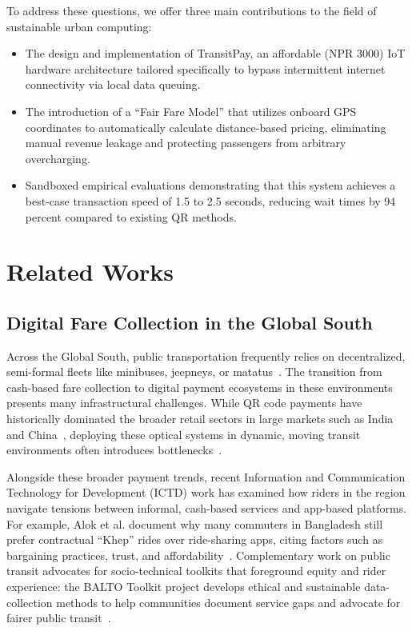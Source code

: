 \documentclass[manuscript,review,anonymous]{acmart}
\begin{document}
To address these questions, we offer three main contributions to the field of sustainable urban computing:
\begin{itemize}
  \item The design and implementation of TransitPay, an affordable (NPR 3000) IoT hardware architecture tailored specifically to bypass intermittent internet connectivity via local data queuing.
  \item The introduction of a ``Fair Fare Model'' that utilizes onboard GPS coordinates to automatically calculate distance-based pricing, eliminating manual revenue leakage and protecting passengers from arbitrary overcharging.
  \item Sandboxed empirical evaluations demonstrating that this system achieves a best-case transaction speed of 1.5 to 2.5 seconds, reducing wait times by 94 percent compared to existing QR methods.
\end{itemize}


\section{Related Works}

\subsection{Digital Fare Collection in the Global South}
Across the Global South, public transportation frequently relies on decentralized, semi-formal fleets like minibuses, jeepneys, or matatus~\cite{jica2017kathmandu_transport}. The transition from cash-based fare collection to digital payment ecosystems in these environments presents many infrastructural challenges. While QR code payments have historically dominated the broader retail sectors in large markets such as India and China~\cite{de2023qr}, deploying these optical systems in dynamic, moving transit environments often introduces bottlenecks~\cite{de2023qr}.

Alongside these broader payment trends, recent Information and Communication Technology for Development (ICTD) work has examined how riders in the region navigate tensions between informal, cash-based services and app-based platforms. For example, Alok et al. document why many commuters in Bangladesh still prefer contractual ``Khep'' rides over ride-sharing apps, citing factors such as bargaining practices, trust, and affordability~\cite{alok2023khep}. Complementary work on public transit advocates for socio-technical toolkits that foreground equity and rider experience: the BALTO Toolkit project develops ethical and sustainable data-collection methods to help communities document service gaps and advocate for fairer public transit~\cite{frias2023balto}. 
\end{document}
